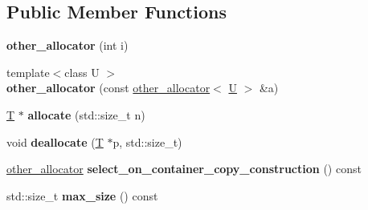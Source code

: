 \subsection*{Public Member Functions}
\begin{DoxyCompactItemize}
\item 
\mbox{\label{classother__allocator_a2681e72b15cdf8fc368fdac8c7fb8c70}} 
{\bfseries other\+\_\+allocator} (int i)
\item 
\mbox{\label{classother__allocator_abd12148c5be9337fb0c53e32430458be}} 
{\footnotesize template$<$class U $>$ }\\{\bfseries other\+\_\+allocator} (const \mbox{\hyperlink{classother__allocator}{other\+\_\+allocator}}$<$ \mbox{\hyperlink{union_u}{U}} $>$ \&a)
\item 
\mbox{\label{classother__allocator_a25f27bce9728da831939aa28a9ab9820}} 
\mbox{\hyperlink{struct_t}{T}} $\ast$ {\bfseries allocate} (std\+::size\+\_\+t n)
\item 
\mbox{\label{classother__allocator_a5a4b03901cc697a3de04e64881d43b2e}} 
void {\bfseries deallocate} (\mbox{\hyperlink{struct_t}{T}} $\ast$p, std\+::size\+\_\+t)
\item 
\mbox{\label{classother__allocator_ac31a571b8b6daa53aaccb083f43c14f3}} 
\mbox{\hyperlink{classother__allocator}{other\+\_\+allocator}} {\bfseries select\+\_\+on\+\_\+container\+\_\+copy\+\_\+construction} () const
\item 
\mbox{\label{classother__allocator_a8b7572ce28685493aa564d081c0085bc}} 
std\+::size\+\_\+t {\bfseries max\+\_\+size} () const
\end{DoxyCompactItemize}
